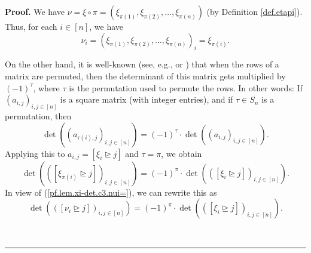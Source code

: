 \documentclass
[numbers=enddot,12pt,final,onecolumn,notitlepage,english]{scrartcl}%
\theoremstyle{definition}
\newenvironment{proof}[1][Proof]{\noindent\textbf{#1.} }{\ \rule{0.5em}{0.5em}}
\newenvironment{verlong}{}{}
\begin{document}
\begin{proof}
\begin{verlong}
We have $\nu=\xi\circ\pi=\left(  \xi_{\pi\left(  1\right)  },\xi_{\pi\left(
2\right)  },\ldots,\xi_{\pi\left(  n\right)  }\right)  $ (by Definition
\ref{def.etapi}). Thus, for each $i\in\left[  n\right]  $, we have
\begin{equation}
\nu_{i}=\left(  \xi_{\pi\left(  1\right)  },\xi_{\pi\left(  2\right)  }%
,\ldots,\xi_{\pi\left(  n\right)  }\right)  _{i}=\xi_{\pi\left(  i\right)  }.
\label{pf.lem.xi-det.c3.nui=}%
\end{equation}


On the other hand, it is well-known (see, e.g., \cite[Corollary 6.4.15]{21s}
or \cite[Lemma 6.17 \textbf{(a)}]{detnotes}) that when the rows of a matrix
are permuted, then the determinant of this matrix gets multiplied by $\left(
-1\right)  ^{\tau}$, where $\tau$ is the permutation used to permute the rows.
In other words: If $\left(  a_{i,j}\right)  _{i,j\in\left[  n\right]  }$ is a
square matrix (with integer entries), and if $\tau\in S_{n}$ is a permutation,
then%
\[
\det\left(  \left(  a_{\tau\left(  i\right)  ,j}\right)  _{i,j\in\left[
n\right]  }\right)  =\left(  -1\right)  ^{\tau}\cdot\det\left(  \left(
a_{i,j}\right)  _{i,j\in\left[  n\right]  }\right)  .
\]
Applying this to $a_{i,j}=\left[  \xi_{i}\trianglerighteq j\right]  $ and
$\tau=\pi$, we obtain%
\[
\det\left(  \left(  \left[  \xi_{\pi\left(  i\right)  }\trianglerighteq
j\right]  \right)  _{i,j\in\left[  n\right]  }\right)  =\left(  -1\right)
^{\pi}\cdot\det\left(  \left(  \left[  \xi_{i}\trianglerighteq j\right]
\right)  _{i,j\in\left[  n\right]  }\right)  .
\]
In view of (\ref{pf.lem.xi-det.c3.nui=}), we can rewrite this as%
\begin{equation}
\det\left(  \left(  \left[  \nu_{i}\trianglerighteq j\right]  \right)
_{i,j\in\left[  n\right]  }\right)  =\left(  -1\right)  ^{\pi}\cdot\det\left(
\left(  \left[  \xi_{i}\trianglerighteq j\right]  \right)  _{i,j\in\left[
n\right]  }\right)  . \label{pf.lem.xi-det.c3.det=1}%
\end{equation}

\end{verlong}


\end{proof}
\end{document}
